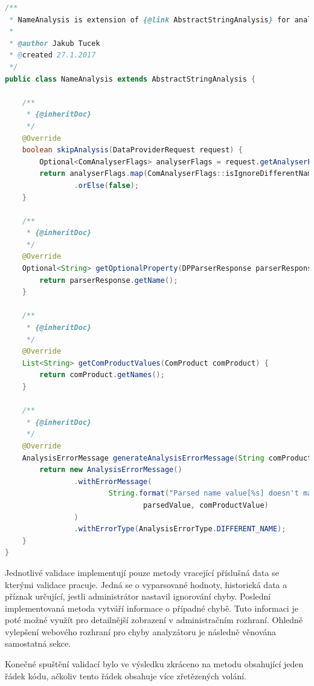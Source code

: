 \documentclass[thesis=B,czech]{FITthesis}[2012/06/26]
\begin{document}
\begin{lstlisting}[language=Java, caption={Validace kontrolující hodnotu získaného jména produktu}]
/**
 * NameAnalysis is extension of {@link AbstractStringAnalysis} for analysing Name.
 *
 * @author Jakub Tucek
 * @created 27.1.2017
 */
public class NameAnalysis extends AbstractStringAnalysis {

    /**
     * {@inheritDoc}
     */
    @Override
    boolean skipAnalysis(DataProviderRequest request) {
        Optional<ComAnalyserFlags> analyserFlags = request.getAnalyserFlags();
        return analyserFlags.map(ComAnalyserFlags::isIgnoreDifferentName)
                .orElse(false);
    }

    /**
     * {@inheritDoc}
     */
    @Override
    Optional<String> getOptionalProperty(DPParserResponse parserResponse) {
        return parserResponse.getName();
    }

    /**
     * {@inheritDoc}
     */
    @Override
    List<String> getComProductValues(ComProduct comProduct) {
        return comProduct.getNames();
    }

    /**
     * {@inheritDoc}
     */
    @Override
    AnalysisErrorMessage generateAnalysisErrorMessage(String comProductValue, String parsedValue) {
        return new AnalysisErrorMessage()
                .withErrorMessage(
                        String.format("Parsed name value[%s] doesn't match known name value[%s]",
                                parsedValue, comProductValue)
                )
                .withErrorType(AnalysisErrorType.DIFFERENT_NAME);
    }
}
\end{lstlisting}
Jednotlivé validace implementují pouze metody vracející příslušná data se kterými validace pracuje. Jedná se o vyparsované hodnoty, historická
data a příznak určující, jestli administrátor nastavil ignorování chyby.
Poslední implementovaná metoda vytváří informace o případné chybě. Tuto informaci je poté
možné využít pro detailnější zobrazení v administračním rozhraní. Ohledně vylepšení webového rozhraní pro chyby analyzátoru je následně věnována samostatná sekce.
\par
Konečné spuštění validací bylo ve výsledku zkráceno na metodu obsahující jeden řádek kódu, ačkoliv tento řádek
obsahuje více zřetězených volání.
\par
\end{document}
